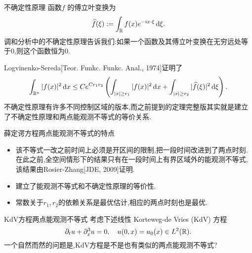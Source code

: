 \begin{frame}[t]{不确定性原理}
  函数$f$ 的傅立叶变换为
  \begin{equation}
    \widehat{f}(\xi):=\int_{\mathbb{R}} f(x)e^{-ix\cdot \xi}\,\mathrm{d}\xi.
  \end{equation}
  调和分析中的不确定性原理告诉我们:如果一个函数及其傅立叶变换在无穷远处等于$0$,则这个函数恒为$0$.


  Logvinenko-Sereda[Teor. Funkc. Funkc. Anal., 1974]证明了
 \begin{equation}\label{unc}
   \int_{\mathbb{R}^{n}}|f(x)|^2\,\mathrm{d}x\le C e^{Cr_1r_2}\left( \int_{|x|\ge r_1}|f(x)|^2\,\mathrm{d}x+\int_{|x|\ge r_2}|\widehat{f}(\xi)|^2\,\mathrm{d}\xi \right).
 \end{equation}
 不确定性原理有许多不同控制区域的版本,而之前提到的定理完整版其实就是建立了不确定性原理和两点能观测不等式的等价关系.
\end{frame}

\begin{frame}[t]{薛定谔方程两点能观测不等式的特点}
  \begin{itemize}
    \item 该不等式一改之前时间上必须是开区间的限制,把一段时间改进到了两点时刻.在此之前,全空间情形下的结果只有在一段时间上有界区域外的能观测不等式,该结果由Rosier-Zhang[JDE, 2009]证明.
    \item 建立了能观测不等式和不确定性原理的等价性.
    \item 常数关于$r_1,r_2$的依赖关系是最优估计,相应的两点时刻也是最优.
  \end{itemize}
\end{frame}


\begin{frame}[t]{KdV方程两点能观测不等式}
  考虑下述线性 Korteweg-de Vries (KdV) 方程
  \begin{equation}\label{kdv}
    \partial_t u +\partial_x^3u=0,\quad u(0,x)=u_0(x)\in L^2(\mathbb{R}).
  \end{equation}
一个自然而然的问题是,KdV方程是不是也有类似的两点能观测不等式?
\end{frame}

